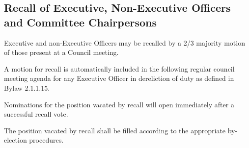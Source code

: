 \subsection {Recall of Executive, Non-Executive Officers and Committee  \hfill \break Chairpersons}
\begin{longenum}[ label*=\thesubsection.\arabic*., align=left]
	\item Executive and non-Executive Officers may be recalled by a 2/3 majority motion of those present at a Council meeting.
   \label{recall_non-exec}
    \item A motion for recall is automatically included in the following regular council meeting agenda for any Executive Officer in dereliction of duty as defined in Bylaw 2.1.1.15.
    \item Nominations for the position vacated by recall will open immediately after a successful recall vote.
    \item The position vacated by recall shall be filled according to the appropriate by-election procedures.
\end{longenum}

